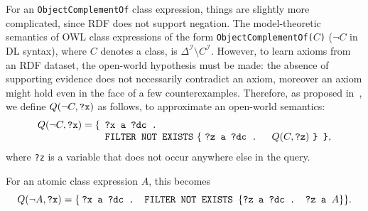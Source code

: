 \documentclass{llncs}
\begin{document}
For an \texttt{ObjectComplementOf} class expression, things are slightly more complicated, since RDF does not support
negation. The model-theoretic semantics of OWL class expressions of the form \texttt{ObjectComplementOf(}$C$\texttt{)}
($\neg C$ in DL syntax), where $C$ denotes a class, is $\Delta^\mathcal{I} \setminus C^\mathcal{I}$.
However, to learn axioms from an RDF dataset, the open-world hypothesis must be made: the absence of
supporting evidence does not necessarily contradict an axiom, moreover an axiom might
hold even in the face of a few counterexamples.
Therefore, as proposed in~\cite{TettamanziFaronZuckerGandon2014ekaw}, we define
$Q(\neg C, \mbox{\tt ?x})$ as follows, to approximate an open-world semantics:
\begin{equation}\label{eq:approx-open-world-negation}
  Q(\neg C, \mbox{\tt ?x}) =
  \begin{minipage}[t]{2in}
    \begin{tabbing}
      \quad\=\quad\=\quad\=\kill
      \{\>\texttt{?x a ?dc .}\\
        \>\texttt{FILTER NOT EXISTS} \{ \texttt{?z a ?dc . } $Q(C, \mbox{\tt ?z})$ \texttt{\} \}},
    \end{tabbing}
  \end{minipage}
\end{equation}
where \texttt{?z} is a variable that does not occur anywhere else in the query.

For an atomic class expression $A$, this becomes
\begin{equation}
Q(\neg A, \mbox{\tt ?x}) = \{\>\texttt{?x a ?dc . } \mbox{\tt FILTER NOT EXISTS } \{ \mbox{\tt ?z a ?dc . ?z a }A \} \}.
\end{equation}
\end{document}
